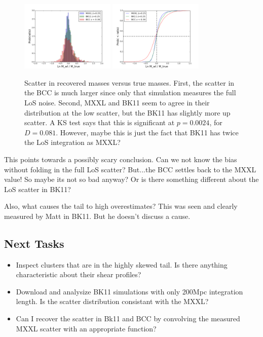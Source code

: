 \documentclass[11pt]{article}
\begin{document}
\begin{figure}\centering
  \includegraphics[width=0.4\textwidth]{figures/lowz_logscatter.png}
  \includegraphics[width=0.4\textwidth]{figures/lowz_logscatter_cdf.png}
\caption{Scatter in recovered masses versus true masses. First, the scatter in the BCC is much larger since only that simulation measures the full LoS noise. Second, MXXL and BK11 seem to agree in their distribution at the low scatter, but the BK11 has slightly more up scatter. A KS test says that this is significant at $p=0.0024$, for $D=0.081$. However, maybe this is just the fact that BK11 has twice the LoS integration as MXXL? }
\end{figure}

This points towards a possibly scary conclusion. Can we not know the bias without folding in the full LoS scatter? But...the BCC settles back to the MXXL value! So maybe its not so bad anyway? Or is there something different about the LoS scatter in BK11?

Also, what causes the tail to high overestimates? This was seen and clearly measured by Matt in BK11. But he doesn't discuss a cause.




\subsection{Next Tasks}

\begin{itemize}
\item Inspect clusters that are in the highly skewed tail. Is there anything characteristic about their shear profiles?
\item Download and analysize BK11 simulations with only 200Mpc integration length. Is the scatter distribution consistant with the MXXL?
\item Can I recover the scatter in Bk11 and BCC by convolving the measured MXXL scatter with an appropriate function?
\end{itemize}
\end{document}
